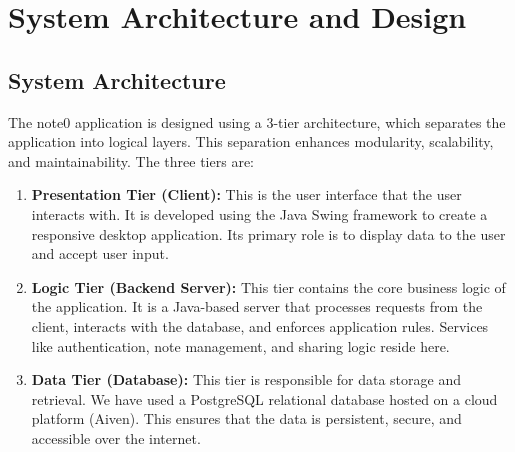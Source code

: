 \documentclass[12pt, a4paper]{report}
\begin{document}
\chapter{System Architecture and Design}

\section{System Architecture}
The note0 application is designed using a 3-tier architecture, which separates the application into logical layers. This separation enhances modularity, scalability, and maintainability. The three tiers are:

\begin{enumerate}
    \item \textbf{Presentation Tier (Client):} This is the user interface that the user interacts with. It is developed using the Java Swing framework to create a responsive desktop application. Its primary role is to display data to the user and accept user input.
    \item \textbf{Logic Tier (Backend Server):} This tier contains the core business logic of the application. It is a Java-based server that processes requests from the client, interacts with the database, and enforces application rules. Services like authentication, note management, and sharing logic reside here.
    \item \textbf{Data Tier (Database):} This tier is responsible for data storage and retrieval. We have used a PostgreSQL relational database hosted on a cloud platform (Aiven). This ensures that the data is persistent, secure, and accessible over the internet.
\end{enumerate}
\end{document}
